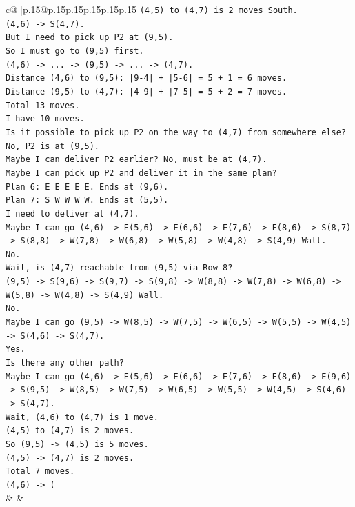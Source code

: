 \documentclass{article}
\begin{document}
{\begin{supertabular}{c@{$\;$}|p{.15\linewidth}@{}p{.15\linewidth}p{.15\linewidth}p{.15\linewidth}p{.15\linewidth}p{.15\linewidth}}
{{{\texttt{(4,5) to (4,7) is 2 moves South.} \\
\texttt{(4,6) {-}> S(4,7).} \\
\texttt{But I need to pick up P2 at (9,5).} \\
\texttt{So I must go to (9,5) first.} \\
\texttt{(4,6) {-}> ... {-}> (9,5) {-}> ... {-}> (4,7).} \\
\texttt{Distance (4,6) to (9,5): |9{-}4| + |5{-}6| = 5 + 1 = 6 moves.} \\
\texttt{Distance (9,5) to (4,7): |4{-}9| + |7{-}5| = 5 + 2 = 7 moves.} \\
\texttt{Total 13 moves.} \\
\texttt{I have 10 moves.} \\
\texttt{Is it possible to pick up P2 on the way to (4,7) from somewhere else?} \\
\texttt{No, P2 is at (9,5).} \\
\texttt{Maybe I can deliver P2 earlier? No, must be at (4,7).} \\
\texttt{Maybe I can pick up P2 and deliver it in the same plan?} \\
\texttt{Plan 6: E E E E E. Ends at (9,6).} \\
\texttt{Plan 7: S W W W W. Ends at (5,5).} \\
\texttt{I need to deliver at (4,7).} \\
\texttt{Maybe I can go (4,6) {-}> E(5,6) {-}> E(6,6) {-}> E(7,6) {-}> E(8,6) {-}> S(8,7) {-}> S(8,8) {-}> W(7,8) {-}> W(6,8) {-}> W(5,8) {-}> W(4,8) {-}> S(4,9) Wall.} \\
\texttt{No.} \\
\texttt{Wait, is (4,7) reachable from (9,5) via Row 8?} \\
\texttt{(9,5) {-}> S(9,6) {-}> S(9,7) {-}> S(9,8) {-}> W(8,8) {-}> W(7,8) {-}> W(6,8) {-}> W(5,8) {-}> W(4,8) {-}> S(4,9) Wall.} \\
\texttt{No.} \\
\texttt{Maybe I can go (9,5) {-}> W(8,5) {-}> W(7,5) {-}> W(6,5) {-}> W(5,5) {-}> W(4,5) {-}> S(4,6) {-}> S(4,7).} \\
\texttt{Yes.} \\
\texttt{Is there any other path?} \\
\texttt{Maybe I can go (4,6) {-}> E(5,6) {-}> E(6,6) {-}> E(7,6) {-}> E(8,6) {-}> E(9,6) {-}> S(9,5) {-}> W(8,5) {-}> W(7,5) {-}> W(6,5) {-}> W(5,5) {-}> W(4,5) {-}> S(4,6) {-}> S(4,7).} \\
\texttt{Wait, (4,6) to (4,7) is 1 move.} \\
\texttt{(4,5) to (4,7) is 2 moves.} \\
\texttt{So (9,5) {-}> (4,5) is 5 moves.} \\
\texttt{(4,5) {-}> (4,7) is 2 moves.} \\
\texttt{Total 7 moves.} \\
\texttt{(4,6) {-}> (} \\
            }
        }
    }
    & & \\ \\


\end{supertabular}}
\end{document}
